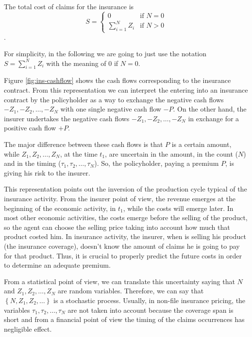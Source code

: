 \documentclass[a4paper, twoside, openright, 12pt]{report}
\theoremstyle{definition}
\theoremstyle{definition}
\theoremstyle{definition}
\theoremstyle{remark}
\begin{document}
The total cost of claims for the insurance is
\[
S = 
\begin{cases}
  0                    & \text{if } N=0 \\
  \sum_{i=1}^{N}{Z_i}  & \text{if } N>0
\end{cases}
\].

For simplicity, in the following we are going to just use the notation \(S = \sum_{i=1}^{N}{Z_i}\) with the meaning of \(0\) if \(N=0\).

Figure \ref{fig:ins-cashflow} shows the cash flows corresponding to the insurance contract. From this representation we can interpret the entering into an insurance contract by the policyholder as a way to exchange the negative cash flows \(-Z_1, -Z_2, \dots, -Z_N\) with one single negative cash flow \(-P\). On the other hand, the insurer undertakes the negative cash flows \(-Z_1, -Z_2, \dots, -Z_N\) in exchange for a positive cash flow \(+P\).

The major difference between these cash flows is that \(P\) is a certain amount, while \(Z_1, Z_2, \dots, Z_N\), at the time \(t_1\), are uncertain in the amount, in the count (\(N\)) and in the timing (\(\tau_1, \tau_2, \dots, \tau_N\)). So, the policyholder, paying a premium \(P\), is giving his risk to the insurer.

This representation points out the inversion of the production cycle typical of the insurance activity. From the insurer point of view, the revenue emerges at the beginning of the economic activity, in \(t_1\), while the costs will emerge later. In most other economic activities, the costs emerge before the selling of the product, so the agent can choose the selling price taking into account how much that product costed him. In insurance activity, the insurer, when is selling his product (the insurance coverage), doesn't know the amount of claims he is going to pay for that product. Thus, it is crucial to properly predict the future costs in order to determine an adequate premium.

From a statistical point of view, we can translate this uncertainty saying that \(N\) and \(Z_1, Z_2, \dots, Z_N\) are random variables. Therefore, we can say that \(\left\{N, Z_1, Z_2, \dots \right\}\) is a stochastic process. Usually, in non-file insurance pricing, the variables \(\tau_1, \tau_2, \dots, \tau_N\) are not taken into account because the coverage span is short and from a financial point of view the timing of the claims occurrences has negligible effect.
\end{document}
